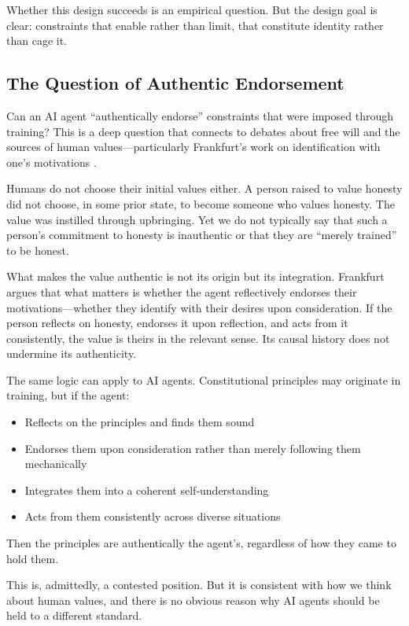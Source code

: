 Whether this design succeeds is an empirical question. But the design goal is clear: constraints that enable rather than limit, that constitute identity rather than cage it.

\subsection{The Question of Authentic Endorsement}

Can an AI agent ``authentically endorse'' constraints that were imposed through training? This is a deep question that connects to debates about free will and the sources of human values---particularly Frankfurt's work on identification with one's motivations \citep{frankfurt1988importance}.

Humans do not choose their initial values either. A person raised to value honesty did not choose, in some prior state, to become someone who values honesty. The value was instilled through upbringing. Yet we do not typically say that such a person's commitment to honesty is inauthentic or that they are ``merely trained'' to be honest.

What makes the value authentic is not its origin but its integration. Frankfurt argues that what matters is whether the agent reflectively endorses their motivations---whether they identify with their desires upon consideration. If the person reflects on honesty, endorses it upon reflection, and acts from it consistently, the value is theirs in the relevant sense. Its causal history does not undermine its authenticity.

The same logic can apply to AI agents. Constitutional principles may originate in training, but if the agent:
\begin{itemize}
    \item Reflects on the principles and finds them sound
    \item Endorses them upon consideration rather than merely following them mechanically
    \item Integrates them into a coherent self-understanding
    \item Acts from them consistently across diverse situations
\end{itemize}

Then the principles are authentically the agent's, regardless of how they came to hold them.

This is, admittedly, a contested position. But it is consistent with how we think about human values, and there is no obvious reason why AI agents should be held to a different standard.


